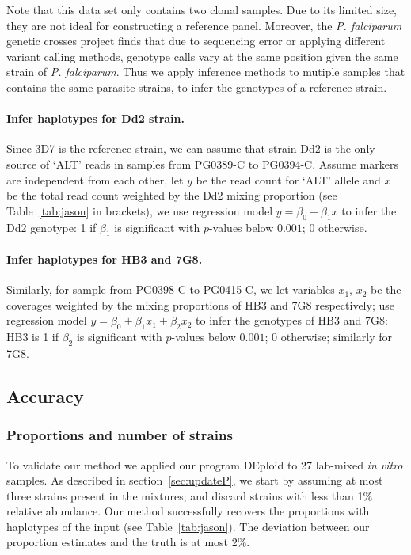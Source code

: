 \documentclass{bioinfo}
\begin{document}
Note that this data set only contains two clonal samples. Due to its limited size, they are not ideal for constructing a reference panel. Moreover, the {\em P. falciparum} genetic crosses project \citep{Miles2015} finds that due to sequencing error or applying different variant calling methods, genotype calls vary at the same position given the same strain of {\em P. falciparum}. Thus we apply inference methods to mutiple samples that contains the same parasite strains, to infer the genotypes of a reference strain.

\paragraph{Infer haplotypes for Dd2 strain.}
Since 3D7 is the reference strain, we can assume that strain Dd2 is the only source of `ALT' reads in samples from {\textmd PG0389-C} to {\textmd PG0394-C}. Assume markers are independent from each other, let $y$ be the read count for `ALT' allele and $x$ be the total read count weighted by the Dd2 mixing proportion (see Table~\ref{tab:jason} in brackets), we use regression model $y = \beta_0 + \beta_{1} x$ to infer the Dd2 genotype: 1 if $\beta_{1}$ is significant with $p$-values below $0.001$; 0 otherwise.

\paragraph{Infer haplotypes for HB3 and 7G8.}
Similarly, for sample from {\textmd PG0398-C} to {\textmd PG0415-C}, we let variables $x_1$, $x_2$ be the coverages weighted by the mixing proportions of HB3 and 7G8 respectively; use regression model $y = \beta_0 + \beta_{1} x_1 + \beta_{2} x_2$ to infer the genotypes of HB3 and 7G8: HB3 is 1 if $\beta_{2}$ is significant with $p$-values below $0.001$; 0 otherwise; similarly for 7G8.

\subsection{Accuracy}
\subsubsection{Proportions and number of strains}
To validate our method we applied our program {\textmd DEploid} to 27 lab-mixed {\em in vitro} samples. As described in section~\ref{sec:updateP}, we start by assuming at most three strains present in the mixtures; and discard strains with less than 1\% relative abundance. Our method successfully recovers the proportions with haplotypes of the input (see Table~\ref{tab:jason}). The deviation between our proportion estimates and the truth is at most 2\%.
\end{document}
